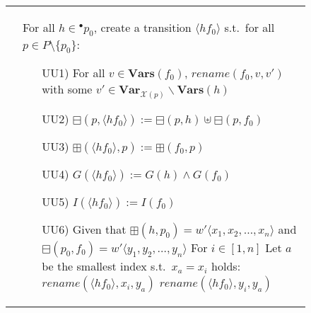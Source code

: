 \begin{figure}
\begin{adjustbox}{center}
\begin{tabular}{|p{70mm}|p{70mm}|}
\begin{itemize}[leftmargin=10mm]
        \end{itemize}

        &
        For all $h\in{}^\bullet p_0$, create a transition $\langle hf_0\rangle$ s.t.\ for all $p\in P\setminus\{p_0\}$:
        \begin{itemize}[leftmargin=10mm]
            \item[UU1)] For all $v \in\textbf{Vars}(f_0)$, $rename(f_0,v,v')$ with some $v' \in\textbf{Var}_{\mathcal{X}(p)}\backslash\textbf{Vars}(h)$
            \item[UU2)] $\boxminus(p,\langle hf_0\rangle):=\boxminus(p,h)\uplus \boxminus(p,f_0)$
            \item[UU3)] $\boxplus(\langle hf_0\rangle,p):=\boxplus(f_0,p)$
            \item[UU4)] $G(\langle hf_0\rangle) := G(h) \land G(f_0)$
            \item[UU5)] $I(\langle hf_0\rangle) := I(f_0)$
            \item[UU6)] Given that $\boxplus(h,p_0) = w{}'\langle x_1, x_2, \dots, x_n \rangle$ and $\boxminus(p_0, f_0) = w{}'\langle y_1, y_2, \dots, y_n \rangle$\newline
            For $i\in[1,n]$\newline
            Let $a$ be the smallest index s.t.\ $x_a = x_i$ holds:
            $rename(\langle hf_0 \rangle, x_i, y_a)$\newline
            $rename(\langle hf_0 \rangle, y_i, y_a)$

\end{itemize}
\end{tabular}
\end{adjustbox}
\end{figure}
